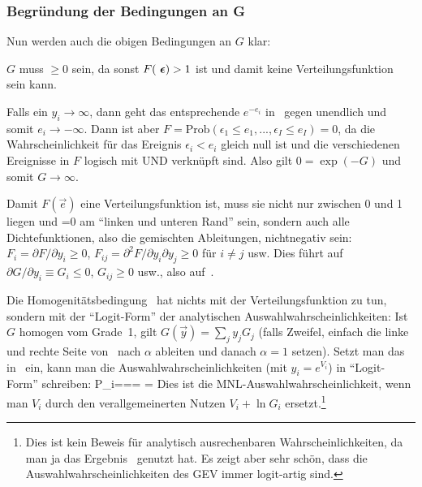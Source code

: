 \subsubsection{Begr\"undung der Bedingungen an G}

Nun werden auch die obigen Bedingungen an $G$ klar:
\bi
\item $G$ muss $\ge 0$ sein, da sonst $F({\mbox{ \boldmath{$\epsilon$}}})>1$ ist und damit
  keine Verteilungsfunktion sein kann.
\item Falls ein $y_i \to \infty$, dann geht das entsprechende
  $e^{-e_i}$ in~ gegen unendlich und somit $e_i \to
  -\infty$. Dann ist aber $F=\text{Prob}(\epsilon_1 \le e_1, ...,
  \epsilon_I \le e_I)=0$, da die Wahrscheinlichkeit f\"ur das Ereignis
  $\epsilon_i<e_i$ gleich null ist und die verschiedenen Ereignisse
  in $F$ logisch mit UND verkn\"upft sind. Also gilt $0=\exp(-G)$ und somit
  $G\to \infty$.
\item Damit $F(\vec{e})$ eine Verteilungsfunktion ist, muss sie nicht nur
  zwischen 0 und 1 liegen und =0 am ``linken und unteren Rand'' sein,
  sondern auch alle Dichtefunktionen, also die
  gemischten Ableitungen, nichtnegativ sein: $F_i=\partial
  F/\partial y_i \ge 0$, $F_{ij}=\partial^2
  F/\partial y_i \partial y_j \ge 0$ f\"ur $i \neq j$ usw. Dies
  f\"uhrt auf $\partial G/\partial y_i \equiv G_i \le 0$, $G_{ij} \ge
  0$ usw., also auf~. 
\item Die Homogenit\"atsbedingung~ hat nichts mit der
  Verteilungsfunktion zu tun, sondern mit der ``Logit-Form'' der
  analytischen 
 Auswahlwahrscheinlichkeiten: Ist $G$ homogen vom Grade~1,
  gilt $G(\vec{y})=\sum_j y_j G_j$ (falls Zweifel, einfach die linke
  und rechte Seite von~ nach $\alpha$ ableiten und danach
  $\alpha=1$ setzen).
   Setzt man das in~ ein, kann man die
  Auswahlwahrscheinlichkeiten (mit $y_i=e^{V_i}$) in ``Logit-Form'' schreiben:
\be
\label{GEVprobLogit}
P_i===
= 
\ee
Dies ist die MNL-Auswahlwahrscheinlichkeit, wenn man $V_i$ durch den
verallgemeinerten Nutzen $V_i+\ln G_i$ ersetzt.\footnote{Dies ist kein
  Beweis f\"ur analytisch ausrechenbaren Wahrscheinlichkeiten, da man
  ja das Ergebnis~ genutzt hat. Es zeigt aber sehr
  sch\"on, dass die 
  Auswahlwahrscheinlichkeiten des GEV immer logit-artig sind.} 
\ei

